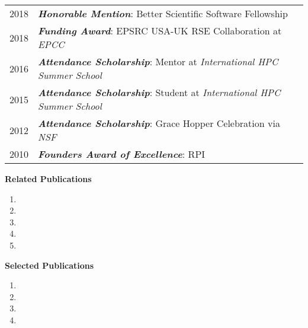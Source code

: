 \documentclass[times,11pt]{article}    %
\begin{document}
\begin{tabular}{ll}
2018 & {\em \bf Honorable Mention}: Better Scientific Software Fellowship\\
2018 & {\em \bf Funding Award}: EPSRC USA-UK RSE Collaboration at {\em EPCC}\\
2016 & {\em \bf Attendance Scholarship}: Mentor at {\em International HPC Summer School}\\
2015 & {\em \bf Attendance Scholarship}: Student at {\em International HPC Summer School}\\
2012 & {\em \bf Attendance Scholarship}: Grace Hopper Celebration via {\em NSF}\\
2010 & {\em \bf Founders Award of Excellence}: RPI
\end{tabular}

\vskip 6pt
\textbf{\sffamily Related Publications}

\begin{enumerate}
\item {}
\item {}
\item {}
\item {}
\item {}
\end{enumerate}

\vskip 6pt
\textbf{\sffamily Selected Publications}

\begin{enumerate}
\item {}
\item {}
\item {}
\item {}
\end{enumerate}


\end{document}

